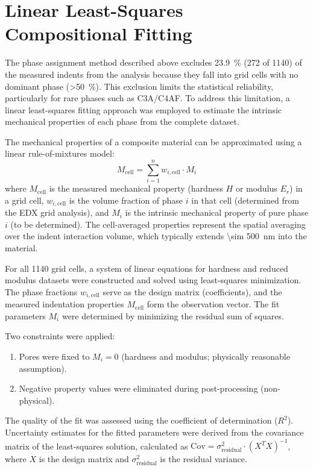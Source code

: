 \section*{Linear Least-Squares Compositional Fitting}
\color{red}
The phase assignment method described above excludes \qty{23.9}{\percent} (\num{272} of \num{1140}) of the measured indents from the analysis because they fall into grid cells with no dominant phase (>\qty{50}{\percent}).
This exclusion limits the statistical reliability, particularly for rare phases such as \acs{C3A}/\acs{C4AF}.
To address this limitation, a linear least-squares fitting approach was employed to estimate the intrinsic mechanical properties of each phase from the complete dataset.

The mechanical properties of a composite material can be approximated using a linear rule-of-mixtures model:
\begin{equation}
	\label{eq:compositional-fit}
	M_{\text{cell}} = \sum_{i=1}^{n} w_{i,\text{cell}} \cdot M_i
\end{equation}
where $M_{\text{cell}}$ is the measured mechanical property (hardness $H$ or modulus $E_r$) in a grid cell, $w_{i,\text{cell}}$ is the volume fraction of phase $i$ in that cell (determined from the \ac{EDX} grid analysis), and $M_i$ is the intrinsic mechanical property of pure phase $i$ (to be determined).
The cell-averaged properties represent the spatial averaging over the indent interaction volume, which typically extends \qty{\sim 500}{\nano\meter} into the material.

For all \num{1140} grid cells, a system of linear equations for hardness and reduced modulus datasets were constructed and solved using least-squares minimization.
The phase fractions $w_{i,\text{cell}}$ serve as the design matrix (coefficients), and the measured indentation properties $M_{\text{cell}}$ form the observation vector.
The fit parameters $M_i$ were determined by minimizing the residual sum of squares.

Two constraints were applied:
\begin{enumerate}
	\item Pores were fixed to $M_i = 0$ (hardness and modulus; physically reasonable assumption).
	\item Negative property values were eliminated during post-processing (non-physical).
\end{enumerate}

The quality of the fit was assessed using the coefficient of determination ($R^2$).
Uncertainty estimates for the fitted parameters were derived from the covariance matrix of the least-squares solution, calculated as $\text{Cov} = \sigma_{\text{residual}}^2 \cdot (X^T X)^{-1}$, where $X$ is the design matrix and $\sigma_{\text{residual}}^2$ is the residual variance.

